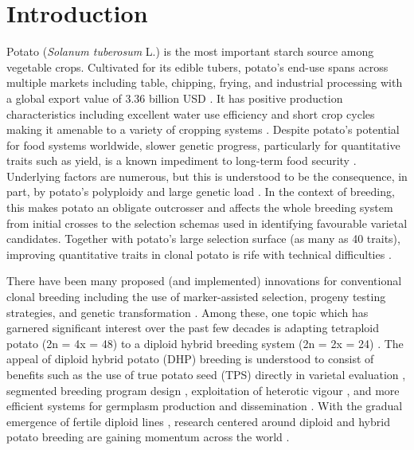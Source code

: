 \newpage


\section{Introduction}

Potato (\textit{Solanum tuberosum} L.) is the most important starch source among vegetable crops. Cultivated for its edible tubers, potato's end-use spans across multiple markets including table, chipping, frying, and industrial processing with a global export value of 3.36 billion USD \parencite{FAO.STAT2023}. It has positive production characteristics including excellent water use efficiency and short crop cycles making it amenable to a variety of cropping systems \parencite{Haverkort1990}. Despite potato's potential for food systems worldwide, slower genetic progress, particularly for quantitative traits such as yield, is a known impediment to long-term food security \parencite{Douches1996}. Underlying factors are numerous, but this is understood to be the consequence, in part, by potato's polyploidy and large genetic load \parencite{Lian2019}. In the context of breeding, this makes potato an obligate outcrosser and affects the whole breeding system from initial crosses to the selection schemas used in identifying favourable varietal candidates. Together with potato's large selection surface (as many as 40 traits), improving quantitative traits in clonal potato is rife with technical difficulties \parencite{Gebhardt2013, Gopal2015}.  

There have been many proposed (and implemented) innovations for conventional clonal breeding including the use of marker-assisted selection, progeny testing strategies, and genetic transformation  \parencite{Bradshaw2022}. Among these, one topic which has garnered significant interest over the past few decades is adapting tetraploid potato (2n = 4x = 48) to a diploid hybrid breeding system (2n = 2x = 24) \parencite{Lindhout2011, Jansky2016}. The appeal of diploid hybrid potato (DHP) breeding is understood to consist of benefits such as the use of true potato seed (TPS) directly in varietal evaluation \parencite{VanDijk2021}, segmented breeding program design \parencite{Technow2021}, exploitation of heterotic vigour \parencite{Technow2012}, and more efficient systems for germplasm production and dissemination \parencite{Pallais1991}. With the gradual emergence of fertile diploid lines \parencite{Eggers2021, Ma2021}, research centered around diploid and hybrid potato breeding are gaining momentum across the world \parencite{Lindhout2018, Bethke2022, Jansky2016, Zhang2021}. 

